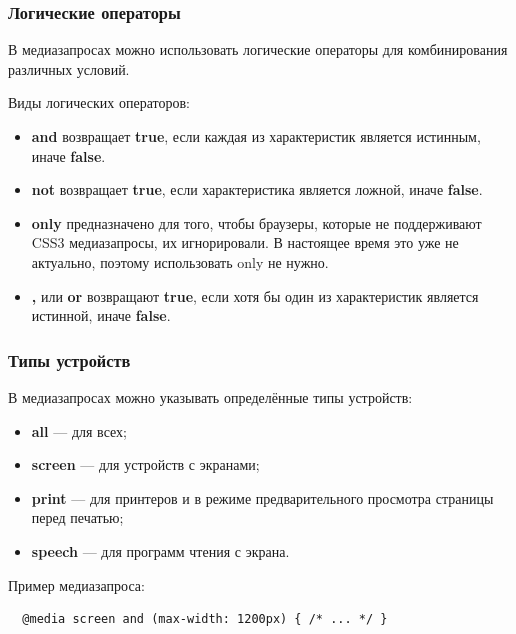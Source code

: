 \documentclass[aspectratio=169]{beamer}
\begin{document}
\begin{frame}[fragile]
  \frametitle{Логические операторы}

  В медиазапросах можно использовать логические операторы для комбинирования
  различных условий.

  \vspace*{1em}

  Виды логических операторов:
  \begin{itemize}
    \item \textbf{and} возвращает \textbf{true}, если каждая из характеристик
    является истинным, иначе \textbf{false}.
    \item \textbf{not} возвращает \textbf{true}, если характеристика является
    ложной, иначе \textbf{false}.
    \item \textbf{only} предназначено для того, чтобы браузеры, которые не
    поддерживают CSS3 медиазапросы, их игнорировали. В настоящее время это уже
    не актуально, поэтому использовать only не нужно.
    \item \textbf{,} или \textbf{or} возвращают \textbf{true}, если хотя бы
    один из характеристик является истинной, иначе \textbf{false}.
  \end{itemize}
\end{frame}

\begin{frame}[fragile]
  \frametitle{Типы устройств}

  В медиазапросах можно указывать определённые типы устройств:
  \begin{itemize}
    \item \textbf{all} --- для всех;
    \item \textbf{screen} --- для устройств с экранами;
    \item \textbf{print} --- для принтеров и в режиме предварительного просмотра
    страницы перед печатью;
    \item \textbf{speech} --- для программ чтения с экрана.
  \end{itemize}

  \vspace*{1em}

  Пример медиазапроса:
  \begin{verbatim}
  @media screen and (max-width: 1200px) { /* ... */ }
  \end{verbatim}
\end{frame}
\end{document}
